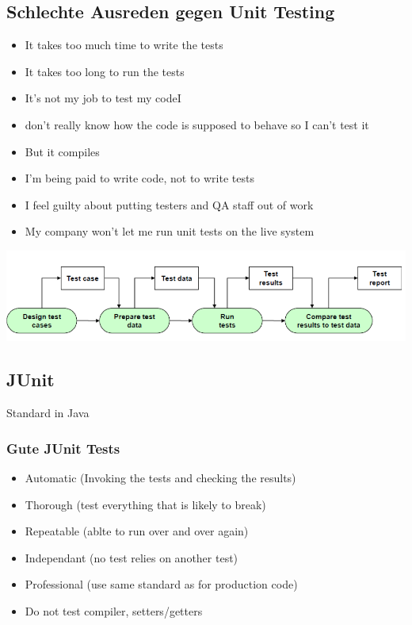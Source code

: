 \documentclass[10pt]{article}
\begin{document}
    \subsection{Schlechte Ausreden gegen Unit Testing}
    \begin{itemize}
        \item It takes too much time to write the tests
        \item It takes too long to run the tests
        \item It's not my job to test my codeI
        \item don't really know how the code is supposed to behave so I can't test it
        \item But it compiles
        \item I'm being paid to write code, not to write tests
        \item I feel guilty about putting testers and QA staff out of work
        \item My company won't let me run unit tests on the live system
    \end{itemize}

    \includegraphics{assets/ablauf_unittesting.png}

    \subsection{JUnit}
    Standard in Java
    \subsubsection{Gute JUnit Tests}
    \begin{itemize}
        \item Automatic (Invoking the tests and checking the results)
        \item Thorough (test everything that is likely to break)
        \item Repeatable (ablte to run over and over again)
        \item Independant (no test relies on another test)
        \item Professional (use same standard as for production code)
        \item Do not test compiler, setters/getters
    \end{itemize}
\end{document}
